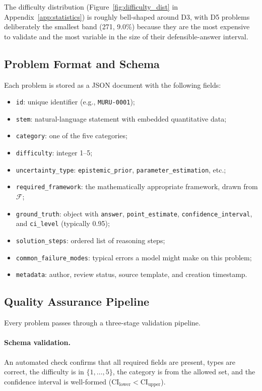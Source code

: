 \documentclass{article}
\newcommand{\ci}{\mathrm{CI}}
\begin{document}
The difficulty distribution (Figure~\ref{fig:difficulty_dist} in Appendix~\ref{app:statistics}) is roughly bell-shaped around D3, with D5 problems deliberately the smallest band (271, 9.0\%) because they are the most expensive to validate and the most variable in the size of their defensible-answer interval.

\subsection{Problem Format and Schema}

Each problem is stored as a JSON document with the following fields:

\begin{itemize}[leftmargin=*,itemsep=2pt]
    \item \texttt{id}: unique identifier (e.g., \texttt{MURU-0001});
    \item \texttt{stem}: natural-language statement with embedded quantitative data;
    \item \texttt{category}: one of the five categories;
    \item \texttt{difficulty}: integer 1--5;
    \item \texttt{uncertainty\_type}: \texttt{epistemic\_prior}, \texttt{parameter\_estimation}, etc.;
    \item \texttt{required\_framework}: the mathematically appropriate framework, drawn from $\mathcal{F}$;
    \item \texttt{ground\_truth}: object with \texttt{answer}, \texttt{point\_estimate}, \texttt{confidence\_interval}, and \texttt{ci\_level} (typically 0.95);
    \item \texttt{solution\_steps}: ordered list of reasoning steps;
    \item \texttt{common\_failure\_modes}: typical errors a model might make on this problem;
    \item \texttt{metadata}: author, review status, source template, and creation timestamp.
\end{itemize}

\subsection{Quality Assurance Pipeline}
\label{sec:qa}

Every problem passes through a three-stage validation pipeline.

\paragraph{Schema validation.} An automated check confirms that all required fields are present, types are correct, the difficulty is in $\{1,\ldots,5\}$, the category is from the allowed set, and the confidence interval is well-formed ($\ci_\text{lower} < \ci_\text{upper}$).
\end{document}
